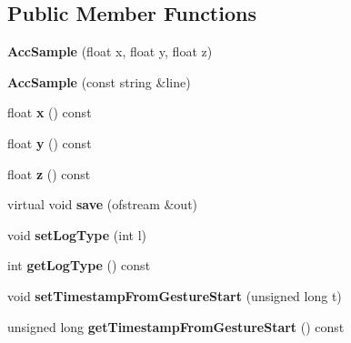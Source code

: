 \subsection*{\-Public \-Member \-Functions}
\begin{DoxyCompactItemize}
\item 
\hypertarget{class_acc_sample_a5892e876569215a5b7b50995a6833f6b}{{\bfseries \-Acc\-Sample} (float x, float y, float z)}\label{class_acc_sample_a5892e876569215a5b7b50995a6833f6b}

\item 
\hypertarget{class_acc_sample_aa34cf984b1524c56192c11fe5675cf05}{{\bfseries \-Acc\-Sample} (const string \&line)}\label{class_acc_sample_aa34cf984b1524c56192c11fe5675cf05}

\item 
\hypertarget{class_acc_sample_a825ac53b7fd8d13dfe91c985f07ceb46}{float {\bfseries x} () const }\label{class_acc_sample_a825ac53b7fd8d13dfe91c985f07ceb46}

\item 
\hypertarget{class_acc_sample_a55d458e0aa735db6b64282d080f724ff}{float {\bfseries y} () const }\label{class_acc_sample_a55d458e0aa735db6b64282d080f724ff}

\item 
\hypertarget{class_acc_sample_ab9345c09ebedc152069f1b85c932db55}{float {\bfseries z} () const }\label{class_acc_sample_ab9345c09ebedc152069f1b85c932db55}

\item 
\hypertarget{class_acc_sample_ad505a6ecf1789caa9a49be3f3bbd113b}{virtual void {\bfseries save} (ofstream \&out)}\label{class_acc_sample_ad505a6ecf1789caa9a49be3f3bbd113b}

\item 
\hypertarget{class_sample_ae728243bef5e290d46a2851ea2ce5fe2}{void {\bfseries set\-Log\-Type} (int l)}\label{class_sample_ae728243bef5e290d46a2851ea2ce5fe2}

\item 
\hypertarget{class_sample_aafff0e8223f3eafa001611a63f194c8a}{int {\bfseries get\-Log\-Type} () const }\label{class_sample_aafff0e8223f3eafa001611a63f194c8a}

\item 
\hypertarget{class_sample_a05edd06782fa94517b8daeb29e12057d}{void {\bfseries set\-Timestamp\-From\-Gesture\-Start} (unsigned long t)}\label{class_sample_a05edd06782fa94517b8daeb29e12057d}

\item 
\hypertarget{class_sample_a94a34fe92c0f8a89485042aaea458d94}{unsigned long {\bfseries get\-Timestamp\-From\-Gesture\-Start} () const }\label{class_sample_a94a34fe92c0f8a89485042aaea458d94}

\end{DoxyCompactItemize}

